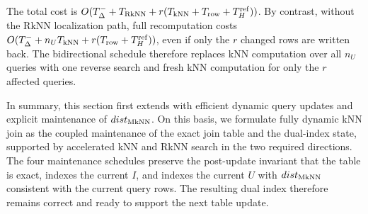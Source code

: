 The total cost is $O(T_{\Delta}^{-}+T_{\operatorname{RkNN}}+r(T_{\operatorname{kNN}}+T_{\mathrm{row}}+T_H^{\mathrm{ref}}))$. By contrast, without the RkNN localization path, full recomputation costs $O(T_{\Delta}^{-}+n_U T_{\operatorname{kNN}}+r(T_{\mathrm{row}}+T_H^{\mathrm{ref}}))$, even if only the $r$ changed rows are written back. The bidirectional schedule therefore replaces kNN computation over all $n_U$ queries with one reverse search and fresh kNN computation for only the $r$ affected queries.

In summary, this section first extends \hdrtree with efficient dynamic query updates and explicit maintenance of $dist_{\operatorname{MkNN}}$. On this basis, we formulate fully dynamic kNN join as the coupled maintenance of the exact join table and the dual-index state, supported by accelerated kNN and RkNN search in the two required directions. The four maintenance schedules preserve the post-update invariant that the table is exact, \deltatree indexes the current $I$, and \hdrtree indexes the current $U$ with $dist_{\operatorname{MkNN}}$ consistent with the current query rows. The resulting dual index therefore remains correct and ready to support the next table update.
